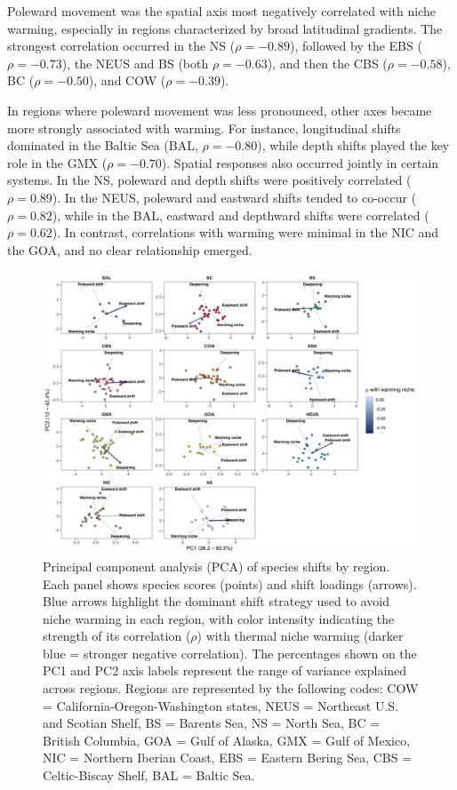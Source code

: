 \documentclass[11pt]{article}
\begin{document}
\begin{spacing}{1.5}
Poleward movement was the spatial axis most negatively correlated with niche warming, especially in regions characterized by broad latitudinal gradients. The strongest correlation occurred in the NS ($\rho = -0.89$), followed by the EBS ($\rho = -0.73$), the NEUS and BS (both $\rho = -0.63$), and then the CBS ($\rho = -0.58$), BC ($\rho = -0.50$), and COW ($\rho = -0.39$).

In regions where poleward movement was less pronounced, other axes became more strongly associated with warming. For instance, longitudinal shifts dominated in the Baltic Sea (BAL, $\rho = -0.80$), while depth shifts played the key role in the GMX ($\rho = -0.70$).
Spatial responses also occurred jointly in certain systems. In the NS, poleward and depth shifts were positively correlated ($\rho = 0.89$). In the NEUS, poleward and eastward shifts tended to co-occur ($\rho = 0.82$), while in the BAL, eastward and depthward shifts were correlated ($\rho = 0.62$).
In contrast, correlations with warming were minimal in the NIC and the GOA, and no clear relationship emerged.

\begin{figure}[h]
    \centering
        \includegraphics[scale=0.6]{output/figures/pca.png}
    \caption{Principal component analysis (PCA) of species shifts by region. Each panel shows species scores (points) and shift loadings (arrows). Blue arrows highlight the dominant shift strategy used to avoid niche warming in each region, with color intensity indicating the strength of its correlation ($\rho$) with thermal niche warming (darker blue = stronger negative correlation). The percentages shown on the PC1 and PC2 axis labels represent the range of variance explained across regions. Regions are represented by the following codes:
COW = California-Oregon-Washington states, NEUS = Northeast U.S. and Scotian Shelf, BS = Barents Sea, NS = North Sea, BC = British Columbia, GOA = Gulf of Alaska, GMX = Gulf of Mexico, NIC = Northern Iberian Coast, EBS = Eastern Bering Sea,
CBS = Celtic-Biscay Shelf,
BAL = Baltic Sea.
}
    \label{fig:pca}
\end{figure}


\end{spacing}
\end{document}
